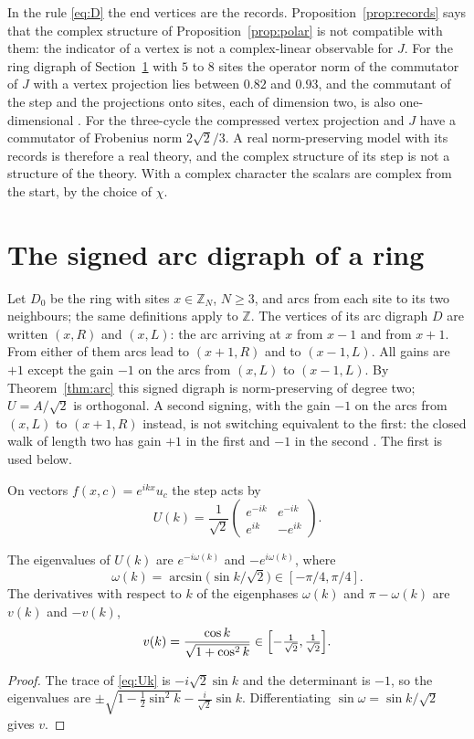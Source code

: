 In the rule \eqref{eq:D} the end vertices are the records. Proposition~\ref{prop:records} says that the complex structure of Proposition~\ref{prop:polar} is not compatible with them: the indicator of a vertex is not a complex-linear observable for $J$. For the ring digraph of Section~\ref{sec:ring} with $5$ to $8$ sites the operator norm of the commutator of $J$ with a vertex projection lies between $0.82$ and $0.93$, and the commutant of the step and the projections onto sites, each of dimension two, is also one-dimensional \cite{comp3}. For the three-cycle the compressed vertex projection and $J$ have a commutator of Frobenius norm $2\sqrt2/3$. A real norm-preserving model with its records is therefore a real theory, and the complex structure of its step is not a structure of the theory. With a complex character the scalars are complex from the start, by the choice of $\chi$.

\section{The signed arc digraph of a ring}\label{sec:ring}

Let $D_0$ be the ring with sites $x\in\mathbb{Z}_N$, $N\ge3$, and arcs from each site to its two neighbours; the same definitions apply to $\mathbb{Z}$. The vertices of its arc digraph $D$ are written $(x,R)$ and $(x,L)$: the arc arriving at $x$ from $x-1$ and from $x+1$. From either of them arcs lead to $(x+1,R)$ and to $(x-1,L)$. All gains are $+1$ except the gain $-1$ on the arcs from $(x,L)$ to $(x-1,L)$. By Theorem~\ref{thm:arc} this signed digraph is norm-preserving of degree two; $U=A/\sqrt2$ is orthogonal. A second signing, with the gain $-1$ on the arcs from $(x,L)$ to $(x+1,R)$ instead, is not switching equivalent to the first: the closed walk of length two has gain $+1$ in the first and $-1$ in the second \cite{comp3}. The first is used below.

On vectors $f(x,c)=e^{ikx}u_c$ the step acts by
\begin{equation}\label{eq:Uk}
U(k)=\frac1{\sqrt2}\begin{pmatrix}e^{-ik}&e^{-ik}\\ e^{ik}&-e^{ik}\end{pmatrix}.
\end{equation}

\begin{lemma}\label{lem:disp}
The eigenvalues of $U(k)$ are $e^{-i\omega(k)}$ and $-e^{i\omega(k)}$, where
\[
\omega(k)=\arcsin\bigl(\sin k/\sqrt2\bigr)\in[-\pi/4,\pi/4].
\]
The derivatives with respect to $k$ of the eigenphases $\omega(k)$ and $\pi-\omega(k)$ are $v(k)$ and $-v(k)$,
\[
v(k)=\frac{\cos k}{\sqrt{1+\cos^2k}}\in\Bigl[-\tfrac1{\sqrt2},\tfrac1{\sqrt2}\Bigr].
\]
\end{lemma}
\begin{proof}
The trace of \eqref{eq:Uk} is $-i\sqrt2\sin k$ and the determinant is $-1$, so the eigenvalues are $\pm\sqrt{1-\tfrac12\sin^2k}-\tfrac{i}{\sqrt2}\sin k$. Differentiating $\sin\omega=\sin k/\sqrt2$ gives $v$.
\end{proof}

